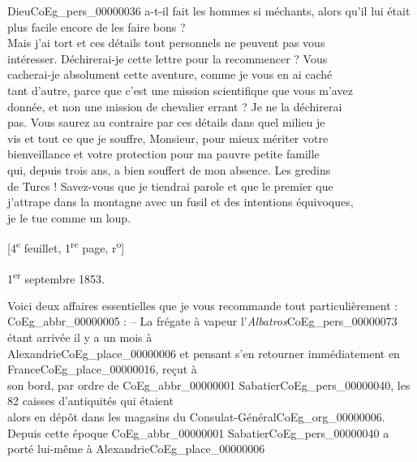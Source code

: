 \documentclass{book}
\begin{document}
Dieu\gls{CoEg_pers_00000036} a-t-il fait les hommes si méchants, alors qu’il lui était\\
plus facile encore de les faire bons ?\\
\indent Mais j’ai tort et ces détails tout personnels ne peuvent pas vous\\
intéresser. Déchirerai-je cette lettre pour la recommencer ? Vous\\
cacherai-je absolument cette aventure, comme je vous en ai caché\\
tant d’autre, parce que c’est une mission scientifique que vous m’avez\\
donnée, et non une mission de chevalier errant ? Je ne la déchirerai\\
pas. Vous saurez au contraire par ces détails dans quel milieu je\\
vis et tout ce que je souffre, Monsieur, pour mieux mériter votre\\
bienveillance et votre protection pour ma pauvre petite famille\\
qui, depuis trois ans, a bien souffert de mon absence. Les gredins\\
de Turcs ! Savez-vous que je tiendrai parole et que le premier que\\
j’attrape dans la montagne avec un fusil et des intentions équivoques,\\
je le tue comme un loup.
{\footnotesize\begin{center} {[4\textsuperscript{e} feuillet, 1\textsuperscript{re} page, r\textsuperscript{o}]}\end{center}}
\noindent {}
\begin{flushright}1\textsuperscript{er} septembre 1853.\end{flushright}
\indent Voici deux affaires essentielles que je vous recommande tout particulièrement :\\
\indent \gls{CoEg_abbr_00000005} : – La frégate à vapeur l’\textit{Albatros}\gls{CoEg_pers_00000073} étant arrivée il y a un mois à\\
Alexandrie\gls{CoEg_place_00000006} et pensant s’en retourner immédiatement en France\gls{CoEg_place_00000016}, reçut à\\
son bord, par ordre de \gls{CoEg_abbr_00000001} Sabatier\gls{CoEg_pers_00000040}, les 82 caisses d’antiquités qui étaient\\
alors en dépôt dans les magasins du Consulat-Général\gls{CoEg_org_00000006}.\\
\indent Depuis cette époque  \gls{CoEg_abbr_00000001} Sabatier\gls{CoEg_pers_00000040} a porté lui-même à Alexandrie\gls{CoEg_place_00000006}\\
\end{document}
